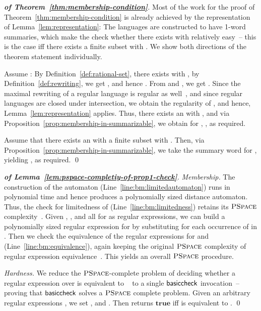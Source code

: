 \documentclass[envcountsame]{llncs}
\newcommand{\PSPACE}{\complexityclass{PSpace}}
\newcommand{\complexityclass}[1]{\ensuremath{\textsc{#1}}\xspace}
\newcommand{\basiccheck}{\ensuremath{{\sf basiccheck}}\xspace}
\newcommand{\boolTrue}{\ensuremath{\mathbf{true}}\xspace}
\begin{document}
\begin{proof}[\textbf{of Theorem~\ref{thm:membership-condition}}]
  Most of the work for the proof of
  Theorem~\ref{thm:membership-condition} is already achieved by the
  representation  of
  Lemma~\ref{lem:representation}:
The languages  are
  constructed to have 1-word summaries, which make the check whether
  there exists  with  relatively easy~-- this
  is the case iff there exists a finite subset  with
  .
We show both directions of the theorem statement individually.


   Assume : By Definition~\ref{def:rational-set},
  there exists  with , by
  Definition~\ref{def:rewriting}, we get , and
  hence .
From  and , we
  get .
Since the maximal rewriting  of a regular language 
  is regular as well~\cite{rewriting}, and since regular languages are
  closed under intersection, we obtain the regularity of , and
  hence, Lemma~\ref{lem:representation} applies.
Thus, there exists an  with
  , and via
  Proposition~\ref{prop:membership-in-summarizable}, we obtain 
for , , as required.


   Assume that there exists an  with a finite subset  with .
Then, via Proposition~\ref{prop:membership-in-summarizable}, we take
  the summary word  for , yielding , as
  required. \qed
\end{proof}



\begin{proof}[\textbf{of Lemma~\ref{lem:pspace-completiy-of-prop1-check}}]
  \emph{Membership.} 
The construction of the automaton 
  (Line~\ref{line:bm:limitedautomaton}) runs in polynomial time and
  hence produces a polynomially sized distance automaton. 
Thus, the check for limitedness of 
  (Line~\ref{line:bm:limitedness}) retains its \PSPACE
  complexity~\cite{DBLP:conf/focs/MeyerS72}.
Given , , and all  for  as
  regular expressions, we can build a polynomially sized regular
  expression for  by substituting  for
  each occurrence of  in .
Then we check the equivalence of the regular expressions for
   and  (Line~\ref{line:bm:equivalence}), again
  keeping the original \PSPACE complexity of regular expression
  equivalence~\cite{DBLP:conf/focs/MeyerS72}.
This yields an overall \PSPACE procedure.



  \emph{Hardness.} 
We reduce the \PSPACE-complete problem of deciding whether a regular
  expression  over  is equivalent to
  ~\cite{DBLP:conf/focs/MeyerS72} to a single
  \basiccheck invocation~-- proving that \basiccheck solves a \PSPACE
  complete problem.
Given an arbitrary regular expressions , we set ,
   and . Then
   returns \boolTrue iff  is equivalent
  to .
\qed
\end{proof}
\end{document}
